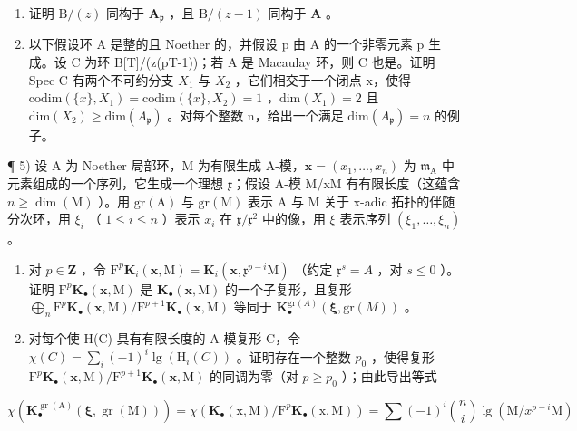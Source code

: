 \begin{enumerate}
\def\labelenumi{\alph{enumi})}
\item
  证明 \(\mathrm{B} / (z)\) 同构于 \(\mathbf{A}_{\mathfrak{p}}\) ，且 \(\mathrm{B} / (z - 1)\) 同构于 \(\mathbf{A}\) 。
\item
  以下假设环 A 是整的且 Noether 的，并假设 p 由 A 的一个非零元素 p 生成。设 C 为环 B{[}T{]}/(z(pT-1))；若 A 是 Macaulay 环，则 C 也是。证明 Spec C 有两个不可约分支 \(X_{1}\) 与 \(X_{2}\) ，它们相交于一个闭点 x，使得 \(\text{codim}(\{x\}, X_{1}) = \text{codim}(\{x\}, X_{2}) = 1\) ，\(\text{dim}(X_{1}) = 2\) 且 \(\text{dim}(X_{2}) \geqslant \text{dim}(A_{\mathfrak{p}})\) 。对每个整数 n，给出一个满足 \(\text{dim}(A_{\mathfrak{p}}) = n\) 的例子。
\end{enumerate}

¶ 5) 设 A 为 Noether 局部环，M 为有限生成 A-模，\(\mathbf{x} = (x_{1},\ldots ,x_{n})\) 为 \(\mathfrak{m}_{\mathrm{A}}\) 中元素组成的一个序列，它生成一个理想 \(\mathfrak{x}\)；假设 A-模 M/xM 有有限长度（这蕴含 \(n\geqslant \dim (\mathrm{M})\) ）。用 \(\mathrm{gr(A)}\) 与 \(\mathrm{gr(M)}\) 表示 A 与 M 关于 x-adic 拓扑的伴随分次环，用 \(\xi_{i}\) （ \(1\leqslant i\leqslant n\) ）表示 \(x_{i}\) 在 \(\mathfrak{x} / \mathfrak{x}^{2}\) 中的像，用 \(\xi\) 表示序列 \((\xi_1,\dots ,\xi_n)\) 。

\begin{enumerate}
\def\labelenumi{\alph{enumi})}
\item
  对 \(p \in \mathbf{Z}\) ，令 \(\mathrm{F}^p\mathbf{K}_i(\mathbf{x},\mathrm{M}) = \mathbf{K}_i(\mathbf{x},\mathfrak{x}^{p - i}\mathrm{M})\) （约定 \(\mathfrak{x}^s = A\) ，对 \(s \leqslant 0\) ）。证明 \(\mathrm{F}^p\mathbf{K}_{\bullet}(\mathbf{x},\mathrm{M})\) 是 \(\mathbf{K}_{\bullet}(\mathbf{x},\mathrm{M})\) 的一个子复形，且复形 \(\bigoplus_{n}\mathrm{F}^p\mathbf{K}_{\bullet}(\mathbf{x},\mathrm{M}) / \mathrm{F}^{p + 1}\mathbf{K}_{\bullet}(\mathbf{x},\mathrm{M})\) 等同于 \(\mathbf{K}_{\bullet}^{\mathrm{gr}(A)}(\boldsymbol {\xi},\mathrm{gr}(M))\) 。
\item
  对每个使 H(C) 具有有限长度的 A-模复形 C，令 \(\chi(C) = \sum_{i}(-1)^{i}\lg(\mathrm{H}_{i}(C))\) 。证明存在一个整数 \(p_0\) ，使得复形 \(\mathrm{F}^{p}\mathbf{K}_{\bullet}(\mathbf{x},\mathrm{M}) / \mathrm{F}^{p + 1}\mathbf{K}_{\bullet}(\mathbf{x},\mathrm{M})\) 的同调为零（对 \(p\geqslant p_0\) ）；由此导出等式
\end{enumerate}

\[
\chi \left(\mathbf {K} _ {\bullet} ^ {\operatorname{gr} (\mathrm{A})} (\boldsymbol {\xi}, \operatorname{gr} (\mathrm{M}))\right) = \chi \left(\mathbf {K} _ {\bullet} (\mathrm{x}, \mathrm{M}) / \mathrm{F} ^ {p} \mathbf {K} _ {\bullet} (\mathrm{x}, \mathrm{M})\right) = \sum (- 1) ^ {i} \binom {n} {i} \lg (\mathrm{M} / x ^ {p - i} \mathrm{M})
\]

